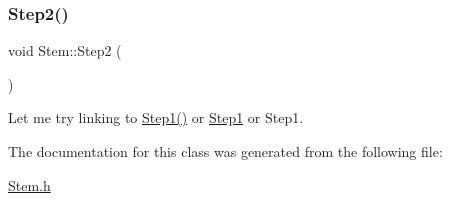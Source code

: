 \subsubsection{\texorpdfstring{Step2()}{Step2()}}
{\footnotesize\ttfamily void Stem\+::\+Step2 (\begin{DoxyParamCaption}{ }\end{DoxyParamCaption})\hspace{0.3cm}{\ttfamily [inline]}}

Let me try linking to \hyperlink{class_stem_a0664001fe76935498f49932b446d43c3}{Step1()} or \hyperlink{class_stem_a0664001fe76935498f49932b446d43c3}{Step1} or Step1. 

The documentation for this class was generated from the following file\+:\begin{DoxyCompactItemize}
\item 
\hyperlink{_stem_8h}{Stem.\+h}\end{DoxyCompactItemize}
